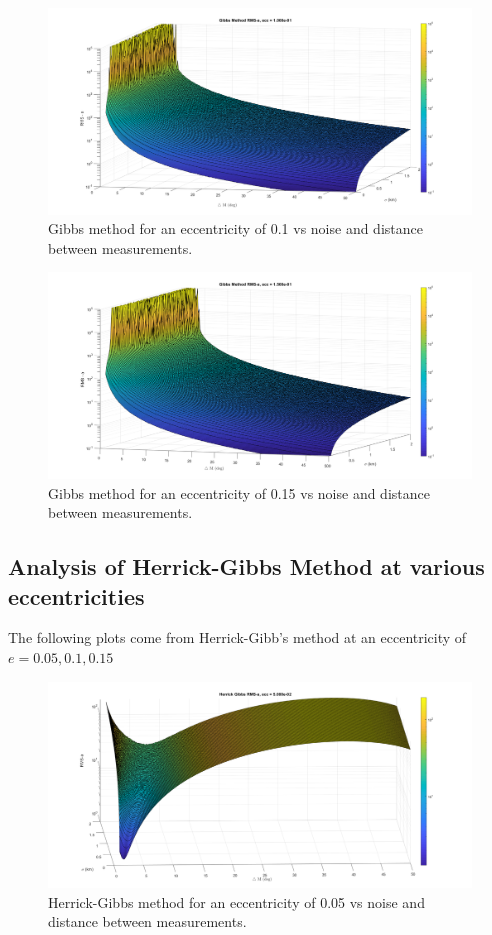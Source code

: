 \documentclass[12pt]{article}
\begin{document}
	\begin{figure}[H]
	\centering
	\includegraphics[width=0.7\linewidth]{gibbs_e_1}
	\caption{Gibbs method for an eccentricity of 0.1 vs noise and distance between measurements.}
	\label{fig:gibbse1}
\end{figure}

	\begin{figure}[H]
	\centering
	\includegraphics[width=0.7\linewidth]{gibbs_e_15}
	\caption{Gibbs method for an eccentricity of 0.15 vs noise and distance between measurements.}
	\label{fig:gibbse15}
\end{figure}
	
	\newpage
	\subsection{Analysis of Herrick-Gibbs Method at various eccentricities}
		The following plots come from Herrick-Gibb's method at an eccentricity of $e=0.05,0.1,0.15$
		\begin{figure}[H]
		\centering
		\includegraphics[width=0.7\linewidth]{herrickgibbs_e_05}
		\caption{Herrick-Gibbs method for an eccentricity of 0.05 vs noise and distance between measurements.}
		\label{fig:herrickgibbse05}
	\end{figure}
	
\end{document}

